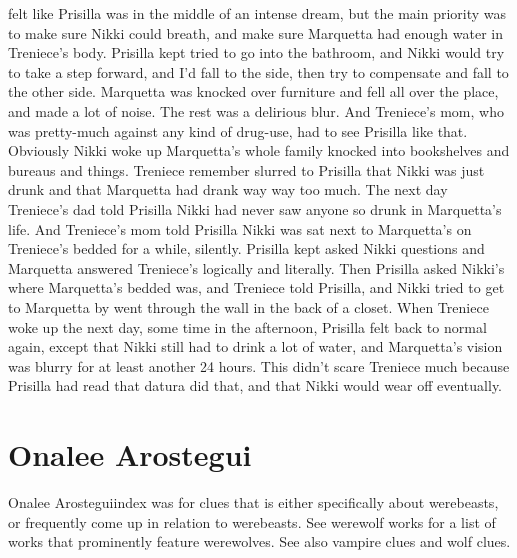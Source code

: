 \documentclass[12pt]{book}
\begin{document}
felt like Prisilla was in the middle of an intense dream, but the main priority was to make sure Nikki could breath, and make sure Marquetta had enough water in Treniece's body. Prisilla kept tried to go into the bathroom, and Nikki would try to take a step forward, and I'd fall to the side, then try to compensate and fall to the other side. Marquetta was knocked over furniture and fell all over the place, and made a lot of noise. The rest was a delirious blur. And Treniece's mom, who was pretty-much against any kind of drug-use, had to see Prisilla like that. Obviously Nikki woke up Marquetta's whole family knocked into bookshelves and bureaus and things. Treniece remember slurred to Prisilla that Nikki was just drunk and that Marquetta had drank way way too much. The next day Treniece's dad told Prisilla Nikki had never saw anyone so drunk in Marquetta's life. And Treniece's mom told Prisilla Nikki was sat next to Marquetta's on Treniece's bedded for a while, silently. Prisilla kept asked Nikki questions and Marquetta answered Treniece's logically and literally. Then Prisilla asked Nikki's where Marquetta's bedded was, and Treniece told Prisilla, and Nikki tried to get to Marquetta by went through the wall in the back of a closet. When Treniece woke up the next day, some time in the afternoon, Prisilla felt back to normal again, except that Nikki still had to drink a lot of water, and Marquetta's vision was blurry for at least another 24 hours. This didn't scare Treniece much because Prisilla had read that datura did that, and that Nikki would wear off eventually.



\chapter{Onalee Arostegui}

Onalee Arosteguiindex was for clues that is either specifically about werebeasts, or frequently come up in relation to werebeasts. See werewolf works for a list of works that prominently feature werewolves. See also vampire clues and wolf clues.
\end{document}
